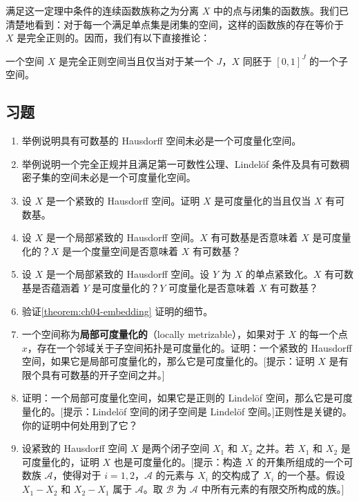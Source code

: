 满足这一定理中条件的连续函数族称之为分离 $X$ 中的点与闭集的函数族。我们已清楚地看到：对于每一个满足单点集是闭集的空间，这样的函数族的存在等价于 $X$ 是完全正则的。因而，我们有以下直接推论：

\begin{theorem}\label{theorem:ch04-completely-regular-cube}
一个空间 $X$ 是完全正则空间当且仅当对于某一个 $J$，$X$ 同胚于 $[0,1]^{J}$ 的一个子空间。
\end{theorem}

\subsection*{习题}

\begin{enumerate}
\item 举例说明具有可数基的 Hausdorff 空间未必是一个可度量化空间。
\item 举例说明一个完全正规并且满足第一可数性公理、Lindelöf 条件及具有可数稠密子集的空间未必是一个可度量化空间。
\item 设 $X$ 是一个紧致的 Hausdorff 空间。证明 $X$ 是可度量化的当且仅当 $X$ 有可数基。
\item 设 $X$ 是一个局部紧致的 Hausdorff 空间。$X$ 有可数基是否意味着 $X$ 是可度量化的？$X$ 是一个度量空间是否意味着 $X$ 有可数基？
\item 设 $X$ 是一个局部紧致的 Hausdorff 空间。设 $Y$ 为 $X$ 的单点紧致化。$X$ 有可数基是否蕴涵着 $Y$ 是可度量化的？$Y$ 可度量化是否意味着 $X$ 有可数基？
\item 验证\cref{theorem:ch04-embedding} 证明的细节。
\item 一个空间称为\textbf{局部可度量化的}（locally metrizable），如果对于 $X$ 的每一个点 $x$，存在一个邻域关于子空间拓扑是可度量化的。证明：一个紧致的 Hausdorff 空间，如果它是局部可度量化的，那么它是可度量化的。[提示：证明 $X$ 是有限个具有可数基的开子空间之并。]
\item 证明：一个局部可度量化空间，如果它是正则的 Lindelöf 空间，那么它是可度量化的。[提示：Lindelöf 空间的闭子空间是 Lindelöf 空间。]正则性是关键的。你的证明中何处用到了它？
\item 设紧致的 Hausdorff 空间 $X$ 是两个闭子空间 $X_{1}$ 和 $X_{2}$ 之并。若 $X_{1}$ 和 $X_{2}$ 是可度量化的，证明 $X$ 也是可度量化的。[提示：构造 $X$ 的开集所组成的一个可数族 $\mathcal{A}$，使得对于 $i=1,2$，$\mathcal{A}$ 的元素与 $X_{i}$ 的交构成了 $X_{i}$ 的一个基。假设 $X_{1}-X_{2}$ 和 $X_{2}-X_{1}$ 属于 $\mathcal{A}$。取 $\mathcal{B}$ 为 $\mathcal{A}$ 中所有元素的有限交所构成的族。]
\end{enumerate}
